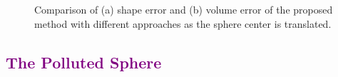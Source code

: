 \begin{figure}[b!]
	\centering
	\caption{Comparison of (a) shape error and (b) volume error of the proposed method with different approaches as the sphere center is translated.}
	\label{fig:graph3}
\end{figure}
\subsection{\textcolor{purple}{The Polluted Sphere}}
\label{The Polluted Sphere}

